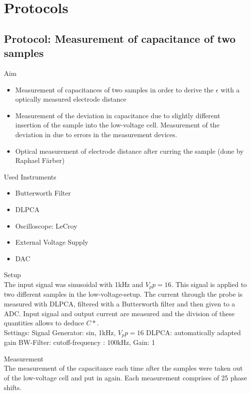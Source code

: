 \chapter{Protocols}
\section{Protocol: Measurement of capacitance of two samples}
\large{Aim} \\
\begin{itemize}

\item Measurement of capacitances of two samples in order to derive the $\epsilon$ with a optically measured electrode distance 
\item Measurement of the deviation in capacitance due to slightly different insertion of the sample into the low-voltage cell. Measurement of the deviation in due to errors in the measurement devices. 
\item Optical measurement of electrode distance after curring the sample (done by Raphael F\"arber) 
\end{itemize}

\large{Used Instruments} 
\begin{itemize}
 \item Butterworth Filter
 \item DLPCA
 \item Oscilloscope: LeCroy
 \item External Voltage Supply
 \item DAC 

\end{itemize}


\large{Setup} \\
The input signal was  sinusoidal with 1kHz and $V_pp=16$. This signal is applied to two different samples in the low-voltage-setup. The current through the probe is measured with DLPCA, filtered with a Butterworth filter and then given to a ADC. 
Input signal and output current are measured and the division of these quantities allows to deduce $C*$.\\

Settings: \newline
Signal Generator:  sin, 1kHz, $V_pp=16$
DLPCA:  automatically adapted gain
BW-Filter:  cutoff-frequency : 100kHz, Gain: 1

\large{Measurement} \\
The measurement of the capacitance each time after the samples were taken out of the low-voltage cell and put in again. Each measurement comprises of 25 phase shifts. 




